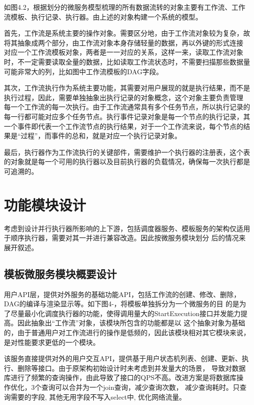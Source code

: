 如图4.2，根据划分的微服务模型梳理的所有数据流转的对象主要有工作流、工作流模板、执行记录、执行器。由上述的对象构建一个系统的模型。

首先，工作流是系统主要的操作对象。需要区分地，由于工作流对象较为复杂，故将其抽象成两个部分，由工作流对象本身存储轻量的数据，再以外键的形式连接
对应一个工作流模板对象，两者是一一对应的关系，这样一来，读取工作流对象时，不一定需要读取全量的数据，比如读取工作流状态时，不需要扫描那些数据量
可能非常大的列，比如图中工作流模板的DAG字段。

其次，工作流执行作为系统主要功能，其需要对用户展现的就是执行结果，而不是执行过程，因此，需要单独抽象出执行记录的对象概念，这个对象主要负责管理
每一个工作流的每一次执行。由于工作流通常具有多个任务节点，所以执行记录的每一行都可能对应多个任务节点。执行事件记录对象是每一个节点的执行记录，其
一个事件即代表一个工作流节点的执行结果，对于一个工作流来说，每个节点的结果是“过程”，而事件的总和，就是对应一个执行记录对象。

最后，执行器作为工作流执行的关键部件，需要维护一个执行器的注册表，这个表的对象就是每一个可用的执行器以及目前执行器的负载情况，确保每一次执行都是
可追溯的。

\section{功能模块设计}
考虑到设计并行执行器所影响的上下游，包括调度器服务、模板服务的架构仅适用于顺序执行器，需要对其一并进行兼容改造。因此按微服务模块划分
后的情况来展开叙述。


\subsection{模板微服务模块概要设计}

用户API层，提供对外服务的基础功能API，包括工作流的创建、修改、删除，DAG的编译与渲染显示等。如下图4-，将模板单独拆分为一个微服务的目
的是为了尽量最小化调度执行器的功能，使得调用量大的StartExecution接口并发能力提高。因此抽象出“工作流”对象，该模块所包含的功能都是以
这个抽象对象为基础的，由于普通用户对工作流进行的操作是低频的，因此该模块相对其它模块来说，是对性能要求更低的一个模块。

该服务直接提供对外的用户交互API，提供基于用户状态机列表、创建、更新、执行、删除等接口。由于原架构初始设计时未考虑到并发量大的场景，
导致对数据库进行了频繁的查询操作，由此导致了接口的QPS不高。改进方案是将数据库操作优化，3个查询可以合并为一个join查询，减少查询次数，
减少查询耗时。只查询需要的字段, 其他无用字段不写入select中, 优化网络流量。

